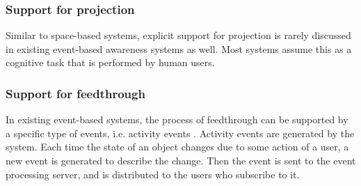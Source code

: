 \subsubsection{Support for projection} %
\label{ssub:support_for_projection}
Similar to space-based systems, explicit support for projection is rarely discussed in existing event-based awareness systems as well. Most systems assume this as a cognitive task that is performed by human users. 


\subsubsection{Support for feedthrough} %
\label{ssub:support_for_feedthrough}
In existing event-based systems, the process of feedthrough can be supported by a specific type of events, i.e. activity events \cite{Fuchs1995}. Activity events are generated by the system. Each time the state of an object changes due to some action of a user, a new event is generated to describe the change. Then the event is sent to the event processing server, and is distributed to the users who subscribe to it. 


